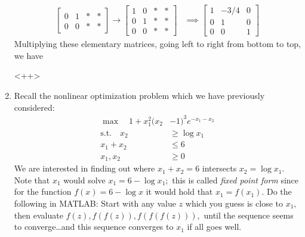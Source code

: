 \documentclass{article}
\begin{document}
\begin{enumerate}
\begin{soln}
\begin{align*}
\begin{bmatrix}
					0 & 1 & * & * \\
					0 & 0 &* & *
				\end{bmatrix} \to \begin{bmatrix}
					1 & 0 & * & * \\
					0 & 1 & * & * \\
					0 & 0 & * & *
				\end{bmatrix} &\implies \begin{bmatrix}
					1 & -3/4 & 0 \\
					0 & 1 & 0 \\
					0 & 0 & 1
				\end{bmatrix}
			\end{align*}
			Multiplying these elementary matrices, going left to right from bottom to top, we have 
		\end{soln}<++>

	\item Recall the nonlinear optimization problem which we have previously considered: 
		\begin{align*}
			\max \quad 1+x_1^2(x_2&-1)^3e^{-x_1-x_2} \\
			\text{s.t.}\quad x_2&\ge\log x_1 \\
			x_1+x_2 &\le 6 \\
			x_1, x_2 &\ge 0
		\end{align*}
		We are interested in finding out where $x_1+x_2=6$ intersects $x_2=\log x_1.$ Note that $x_1$ would solve $x_1=6-\log x_1;$ this is called \textit{fixed point form} since for the function $f(x)=6-\log x$ it would hold that $x_1=f(x_1).$ Do the following in MATLAB: Start with any value $z$ which you guess is close to $x_1,$ then evaluate $f(z), f(f(z)), f(f(f(z))),$ until the sequence seems to converge\ldots and this sequence converges to $x_1$ if all goes well.


\end{enumerate}
\end{document}
